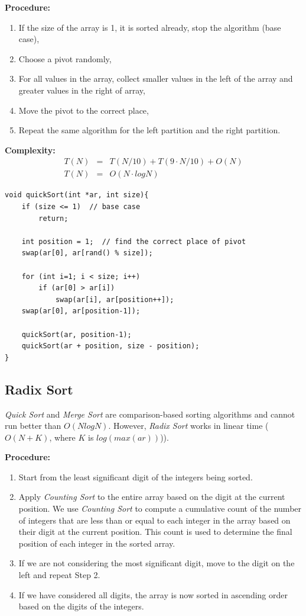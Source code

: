 \documentclass[12pt]{article}
\begin{document}
\textbf{Procedure: }
\begin{enumerate}
	\item If the size of the array is 1, it is sorted already, stop the algorithm (base case),
	\item Choose a pivot randomly,
	\item For all values in the array, collect smaller values in the left of the array and greater values in the right of array,
	\item Move the pivot to the correct place,
	\item Repeat the same algorithm for the left partition and the right partition.
\end{enumerate}	

\textbf{Complexity: }
\begin{eqnarray*}
	T(N) &=& T(N / 10) + T(9\cdot N / 10) + O(N) \\
	T(N) &=& O(N \cdot logN)
\end{eqnarray*}
		
\begin{verbatim}
void quickSort(int *ar, int size){
    if (size <= 1)  // base case
        return;
	
    int position = 1;  // find the correct place of pivot
    swap(ar[0], ar[rand() % size]);
	
    for (int i=1; i < size; i++)
        if (ar[0] > ar[i])
            swap(ar[i], ar[position++]);
    swap(ar[0], ar[position-1]);
	
    quickSort(ar, position-1);
    quickSort(ar + position, size - position);
}
\end{verbatim}


\cleardoublepage
		\subsection{Radix Sort}

	\textit{Quick Sort} and \textit{Merge Sort} are comparison-based sorting algorithms and cannot run better than $O(Nlog N)$. However, \textit{Radix Sort} works in linear time ($O(N + K)$, where $K$ is $log(max(ar))$)).

\textbf{Procedure: }
\begin{enumerate}
    \item Start from the least significant digit of the integers being sorted.
    \item Apply \textit{Counting Sort} to the entire array based on the digit at the current position. We use \textit{Counting Sort} to compute a cumulative count of the number of integers that are less than or equal to each integer in the array based on their digit at the current position. This count is used to determine the final position of each integer in the sorted array.
    \item If we are not considering the most significant digit, move to the digit on the left and repeat Step 2.
    \item If we have considered all digits, the array is now sorted in ascending order based on the digits of the integers.
\end{enumerate}	
\end{document}
